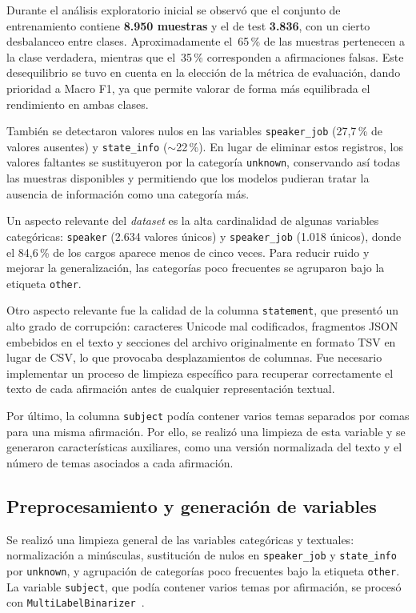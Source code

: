 \documentclass[12pt,a4paper]{article}
\begin{document}
Durante el análisis exploratorio inicial se observó que el conjunto de entrenamiento contiene \textbf{8.950 muestras} y el de test \textbf{3.836}, con un cierto desbalanceo entre clases. Aproximadamente el~65\,\% de las muestras pertenecen a la clase verdadera, mientras que el~35\,\% corresponden a afirmaciones falsas. Este desequilibrio se tuvo en cuenta en la elección de la métrica de evaluación, dando prioridad a Macro F1, ya que permite valorar de forma más equilibrada el rendimiento en ambas clases.

También se detectaron valores nulos en las variables \texttt{speaker\_job} (27,7\,\% de valores ausentes) y \texttt{state\_info} ($\sim$22\,\%). En lugar de eliminar estos registros, los valores faltantes se sustituyeron por la categoría \texttt{unknown}, conservando así todas las muestras disponibles y permitiendo que los modelos pudieran tratar la ausencia de información como una categoría más.

Un aspecto relevante del \emph{dataset} es la alta cardinalidad de algunas variables categóricas: \texttt{speaker} (2.634 valores únicos) y \texttt{speaker\_job} (1.018 únicos), donde el 84,6\,\% de los cargos aparece menos de cinco veces. Para reducir ruido y mejorar la generalización, las categorías poco frecuentes se agruparon bajo la etiqueta \texttt{other}.

Otro aspecto relevante fue la calidad de la columna \texttt{statement}, que presentó un alto grado de corrupción: caracteres Unicode mal codificados, fragmentos JSON embebidos en el texto y secciones del archivo originalmente en formato TSV en lugar de CSV, lo que provocaba desplazamientos de columnas. Fue necesario implementar un proceso de limpieza específico para recuperar correctamente el texto de cada afirmación antes de cualquier representación textual.

Por último, la columna \texttt{subject} podía contener varios temas separados por comas para una misma afirmación. Por ello, se realizó una limpieza de esta variable y se generaron características auxiliares, como una versión normalizada del texto y el número de temas asociados a cada afirmación.

\subsection{Preprocesamiento y generación de variables}

Se realizó una limpieza general de las variables categóricas y textuales: normalización a minúsculas, sustitución de nulos en \texttt{speaker\_job} y \texttt{state\_info} por \texttt{unknown}, y agrupación de categorías poco frecuentes bajo la etiqueta \texttt{other}. La variable \texttt{subject}, que podía contener varios temas por afirmación, se procesó con \texttt{MultiLabelBinarizer}~\cite{sklearn}.
\end{document}
